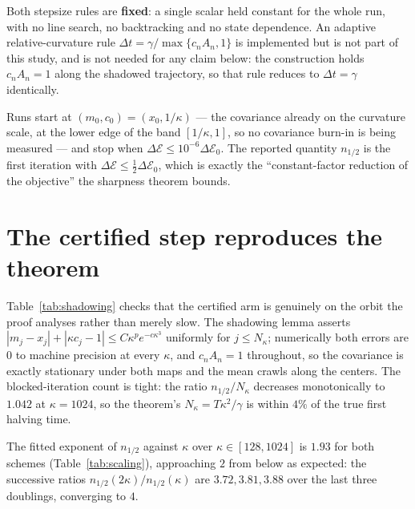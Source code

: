 \documentclass[11pt]{article}
\newcommand{\calE}{\mathcal{E}}
\newcommand{\DeltaE}{\Delta\calE}
\begin{document}
Both stepsize rules are \textbf{fixed}: a single scalar held constant for the whole
run, with no line search, no backtracking and no state dependence. An adaptive
relative-curvature rule $\Delta t=\gamma/\max\{c_nA_n,1\}$ is implemented but is not
part of this study, and is not needed for any claim below: the construction holds
$c_nA_n=1$ along the shadowed trajectory, so that rule reduces to $\Delta t=\gamma$
identically.

Runs start at $(m_0,c_0)=(x_0,1/\kappa)$ --- the covariance already on the curvature
scale, at the lower edge of the band $[1/\kappa,1]$, so no covariance burn-in is
being measured --- and stop when $\DeltaE\le10^{-6}\DeltaE_0$. The reported quantity
$n_{1/2}$ is the first iteration with $\DeltaE\le\tfrac12\DeltaE_0$, which is exactly
the ``constant-factor reduction of the objective'' the sharpness theorem bounds.

\section{The certified step reproduces the theorem}
\label{sec:theory-arm}

Table~\ref{tab:shadowing} checks that the certified arm is genuinely on the orbit the
proof analyses rather than merely slow. The shadowing lemma asserts
$|m_j-x_j|+|\kappa c_j-1|\le C\kappa^pe^{-c\kappa^3}$ uniformly for $j\le N_\kappa$;
numerically both errors are $0$ to machine precision at every $\kappa$, and
$c_nA_n=1$ throughout, so the covariance is exactly stationary under both maps and
the mean crawls along the centers. The blocked-iteration count is tight: the ratio
$n_{1/2}/N_\kappa$ decreases monotonically to $1.042$ at $\kappa=1024$, so the
theorem's $N_\kappa=T\kappa^2/\gamma$ is within $4\%$ of the true first halving time.

\begin{table}[t]
\centering

\caption{Certified arm $\Delta t=\gamma/\kappa$ on the Appendix~C train
(Riemannian; KL agrees to one iteration). The two shadowing columns are the
sup over $0\le j\le N_\kappa$. Both vanish to machine precision, so the lower-bound
mechanism is reproduced exactly rather than approximately.}
\label{tab:shadowing}
\end{table}

The fitted exponent of $n_{1/2}$ against $\kappa$ over $\kappa\in[128,1024]$ is
$1.93$ for both schemes (Table~\ref{tab:scaling}), approaching $2$ from below as
expected: the successive ratios $n_{1/2}(2\kappa)/n_{1/2}(\kappa)$ are
$3.72,3.81,3.88$ over the last three doublings, converging to $4$.
\end{document}
